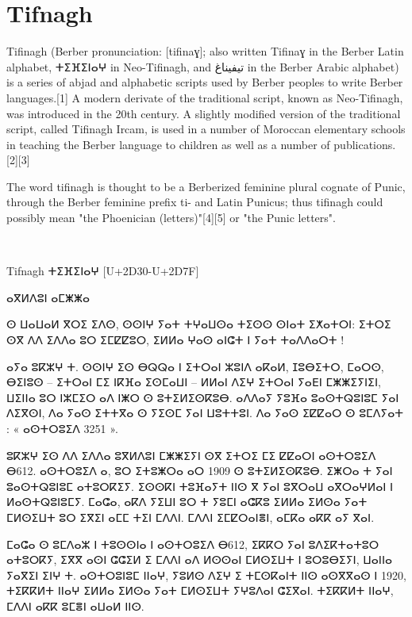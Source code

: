 \section{Tifnagh}

\newfontfamily{}

Tifinagh (Berber pronunciation: [tifinaɣ]; also written Tifinaɣ in the Berber Latin alphabet, {\tifinagh  ⵜⵉⴼⵉⵏⴰⵖ} in Neo-Tifinagh, and تيفيناغ in the Berber Arabic alphabet) is a series of abjad and alphabetic scripts used by Berber peoples to write Berber languages.[1]
A modern derivate of the traditional script, known as Neo-Tifinagh, was introduced in the 20th century. A slightly modified version of the traditional script, called Tifinagh Ircam, is used in a number of Moroccan elementary schools in teaching the Berber language to children as well as a number of publications.[2][3]

The word tifinagh is thought to be a Berberized feminine plural cognate of Punic, through the Berber feminine prefix ti- and Latin Punicus; thus tifinagh could possibly mean "the Phoenician (letters)"[4][5] or "the Punic letters".

\bgroup

\noindent\tifinagh
\colorbox{thecodebackground}{\color{black}^^A
\begin{minipage}{\textwidth}
\parindent1pt
\vskip10pt
 \rightskip\leftskip
Tifnagh     ⵜⵉⴼⵉⵏⴰⵖ [U+2D30-U+2D7F]

ⴰⴳⵍⴷⵓⵏ ⴰⵎⵥⵥⴰ

ⵙ ⵡⴰⵡⴰⵍ ⴳⵔⵉ ⵉⴷⵙ, ⵙⵙⵏⵖ ⵢⴰⵜ ⵜⵖⴰⵡⵙⴰ ⵜⵉⵙⵙ ⵙⵏⴰⵜ  ⵉⵅⴰⵜⵔⵏ: ⵉⵜⵔⵉ ⵙⴳ ⴷⴷ ⵉⴷⴷⴰ ⵓⵔ ⵉⵎⵇⵇⵓⵔ, ⵉⵍⵍⴰ ⵖⴰⵙ ⴰⵏⵛⵜ ⵏ ⵢⴰⵜ ⵜⴰⴷⴷⴰⵔⵜ !

ⴰⵢⴰ ⵓⴽⵣⵖ ⵜ. ⵙⵙⵏⵖ ⵉⵙ ⴱⵕⵕⴰ ⵏ ⵉⵜⵔⴰⵏ ⵣⵓⵏⴷ ⴰⴽⴰⵍ, ⵊⵓⴱⵉⵜⵔ, ⵎⴰⵔⵙ, ⴱⵉⵏⵓⵙ – ⵉⵜⵔⴰⵏ ⵎⵉ ⵏⴽⴼⴰ ⵉⵙⵎⴰⵡⵏ – ⵍⵍⴰⵏ ⴷⵉⵖ ⵉⵜⵔⴰⵏ ⵢⴰⴹⵏ ⵎⵥⵥⵉⵢⵏⵉⵏ, ⵡⵉⵏⵏⴰ ⵓⵔ ⵏⵣⵎⵉⵔ ⴰⴷ ⵏⵥⵔ ⵙ ⵓⵜⵉⵍⵉⵙⴽⵓⴱ. ⴰⴷⴷⴰⵢ ⵢⵓⴼⴰ ⵓⴰⵙⵜⵕⵓⵏⵓⵎ ⵢⴰⵏ ⴷⵉⴳⵙⵏ, ⴷⴰ ⵢⴰⵙ ⵉⵜⵜⴳⴰ ⵙ ⵢⵉⵙⵎ ⵢⴰⵏ ⵡⵓⵜⵜⵓⵏ. ⴷⴰ ⵢⴰⵙ ⵉⵇⵇⴰⵔ ⵙ ⵓⵎⴷⵢⴰⵜ : « ⴰⵙⵜⵔⵓⵉⴷ 3251 ».

ⵓⴽⵣⵖ ⵉⵙ ⴷⴷ ⵉⴷⴷⴰ ⵓⴳⵍⴷⵓⵏ ⵎⵥⵥⵉⵢⵏ ⵙⴳ ⵉⵜⵔⵉ ⵎⵉ ⵇⵇⴰⵔⵏ ⴰⵙⵜⵔⵓⵉⴷ ⴱ612. ⴰⵙⵜⵔⵓⵉⴷ ⴰ, ⵓⵔ ⵉⵜⵓⵥⵔⴰ ⴰⵔ 1909 ⵙ ⵓⵜⵉⵍⵉⵙⴽⵓⴱ. ⵉⵥⵔⴰ ⵜ ⵢⴰⵏ ⵓⴰⵙⵜⵕⵓⵏⵓⵎ ⴰⵜⵓⵔⴽⵉⵢ. ⵉⵙⵙⴽⵏ ⵜⵓⴼⴰⵢⵜ ⵏⵏⵙ ⴳ ⵢⴰⵏ ⵓⴳⵔⴰⵡ ⴰⴳⵔⴰⵖⵍⴰⵏ ⵏ ⵍⴰⵙⵜⵕⵓⵏⵓⵎⵢ. ⵎⴰⵛⴰ, ⴰⴽⴷ ⵢⵉⵡⵏ ⵓⵔ ⵜ ⵢⵓⵎⵏ ⴰⵛⴽⵓ ⵉⵍⵍⴰ ⵉⵍⵙⴰ ⵢⴰⵜ ⵎⵍⵙⵉⵡⵜ ⵓⵔ ⵉⴳⵉⵏ ⴰⵎⵎ ⵜⵉⵏ ⵎⴷⴷⵏ. ⵎⴷⴷⵏ ⵉⵎⵇⵔⴰⵏⴻⵏ, ⴰⵎⴽⴰ ⴰⴽⴽ ⴰⵢ ⴳⴰⵏ.

ⵎⴰⵛⴰ ⵙ ⵓⵎⴷⴰⵣ ⵏ ⵜⵓⵙⵙⵏⴰ ⵏ ⴰⵙⵜⵔⵓⵉⴷ ⴱ612, ⵉⴽⴽⵔ ⵢⴰⵏ ⵓⴷⵉⴽⵜⴰⵜⵓⵔ ⴰⵜⵓⵔⴽⵢ, ⵉⴳⴳ ⴰⵙⵏ ⵛⵛⵉⵍ ⵉ ⵎⴷⴷⵏ ⴰⴷ ⵍⵙⵙⴰⵏ ⵎⵍⵙⵉⵡⵜ ⵏ ⵓⵔⵓⴱⵉⵢⵏ, ⵡⴰⵏⵏⴰ ⵢⴰⴳⵉⵏ ⵉⵏⵖ ⵜ. ⴰⵙⵜⵔⵓⵏⵓⵎ ⵏⵏⴰⵖ, ⵢⵓⵍⵙ ⴷⵉⵖ ⵉ ⵜⵎⵙⴽⴰⵏⵜ ⵏⵏⵙ ⴰⵙⴳⴳⴰⵙ ⵏ 1920, ⵜⵉⴽⴽⵍⵜ ⵏⵏⴰⵖ ⵉⵍⵍⴰ ⵉⵍⵙⴰ ⵢⴰⵜ ⵎⵍⵙⵉⵡⵜ ⵢⵖⵓⴷⴰⵏ ⵛⵉⴳⴰⵏ. ⵜⵉⴽⴽⵍⵜ ⵏⵏⴰⵖ, ⵎⴷⴷⵏ ⴰⴽⴽ ⵓⵎⴻⵏ ⴰⵡⴰⵍ ⵏⵏⵙ.
\par
\vspace*{10pt}
\end{minipage}
}
